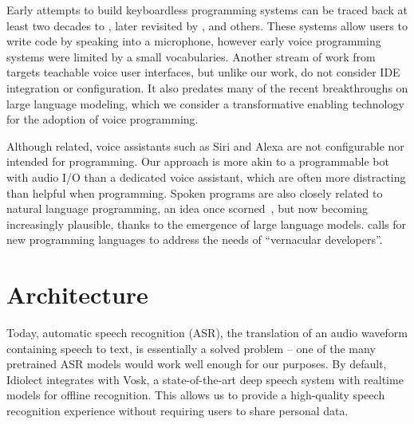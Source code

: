 \documentclass{article}
\theoremstyle{plain}
\theoremstyle{definition}
\theoremstyle{remark}
\begin{document}
Early attempts to build keyboardless programming systems can be traced back at least two decades to \citet{leopold1997keyboardless}, later revisited by \citet{arnold2000programming}, \citet{begel2005spoken} and others. These systems allow users to write code by speaking into a microphone, however early voice programming systems were limited by a small vocabularies. Another stream of work from \citet{chkroun2019lia} targets teachable voice user interfaces, but unlike our work, do not consider IDE integration or configuration. It also predates many of the recent breakthroughs on large language modeling, which we consider a transformative enabling technology for the adoption of voice programming.

Although related, voice assistants such as Siri and Alexa are not configurable nor intended for programming. Our approach is more akin to a programmable bot with audio I/O than a dedicated voice assistant, which are often more distracting than helpful when programming. Spoken programs are also closely related to natural language programming, an idea once scorned~\cite{dijkstra1979foolishness}, but now becoming increasingly plausible, thanks to the emergence of large language models. \citet{shaw2022myths} calls for new programming languages to address the needs of ``vernacular developers''.

\section{Architecture}

Today, automatic speech recognition (ASR), the translation of an audio waveform containing speech to text, is essentially a solved problem -- one of the many pretrained ASR models would work well enough for our purposes. By default, Idiolect integrates with Vosk, a state-of-the-art deep speech system with realtime models for offline recognition. This allows us to provide a high-quality speech recognition experience without requiring users to share personal data.

\end{document}
